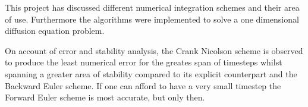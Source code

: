 This project has discussed different numerical integration schemes
and their area of use. Furthermore the algorithms were implemented
to solve a one dimensional diffusion equation problem.

On account of error and stability analysis, the Crank Nicolson
scheme is observed to produce the least numerical error for the greates span of 
timesteps whilst spanning a greater area of stability compared to its explicit
counterpart and the Backward Euler scheme. If one can afford to have a 
very small timestep the Forward Euler scheme is most accurate, but only then.
